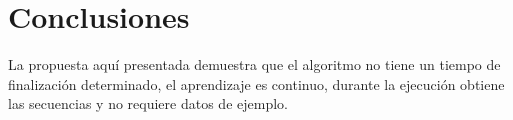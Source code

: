 \section{Conclusiones}
La propuesta aqu\'{i} presentada demuestra que el algoritmo no tiene
 un tiempo de finalizaci\'on determinado, el aprendizaje es continuo, durante 
 la ejecuci\'on obtiene las secuencias y no requiere datos de ejemplo.